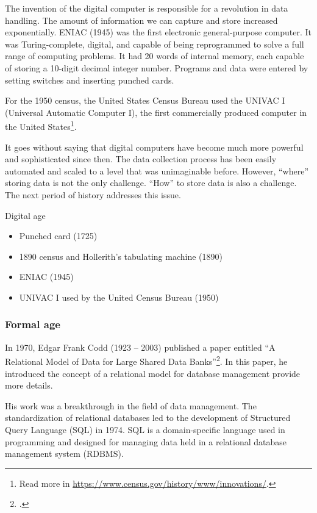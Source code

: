 The invention of the digital computer is responsible for a revolution in data handling.
The amount of information we can capture and store increased exponentially.  ENIAC (1945) was
the first electronic general-purpose computer.  It was Turing-complete, digital, and
capable of being reprogrammed to solve a full range of computing problems.
It had 20 words of internal memory, each capable of storing a 10-digit decimal integer number.
Programs and data were entered by setting switches and inserting punched cards.

For the 1950 census, the United States Census Bureau used the
UNIVAC I (Universal Automatic Computer I), the first commercially produced computer in the
United States\footnote{Read more in \url{https://www.census.gov/history/www/innovations/}.}.

It goes without saying that digital computers have become much more powerful and
sophisticated since then.  The data collection process has been easily automated and
scaled to a level that was unimaginable before.  However, ``where'' storing data is
not the only challenge.  ``How'' to store data is also a challenge.  The next period of
history addresses this issue.

\begin{mainbox}{Digital age}
  \begin{itemize}
    \item Punched card (1725)
    \item 1890 census and Hollerith's tabulating machine (1890)
    \item ENIAC (1945)
    \item UNIVAC I used by the United Census Bureau (1950)
  \end{itemize}
\end{mainbox}

\subsubsection{Formal age}

In 1970, Edgar Frank Codd (1923 -- 2003) published a paper entitled ``A Relational Model
of Data for Large Shared Data Banks''\footcite{Codd1970}.  In this paper, he introduced
the concept of a relational model for database management {\color{red}
provide more details}.

His work was a breakthrough in the field of data management.  The standardization of
relational databases led to the development of Structured Query Language (SQL) in 1974.
SQL is a domain-specific language used in programming and designed for managing data held
in a relational database management system (RDBMS).

